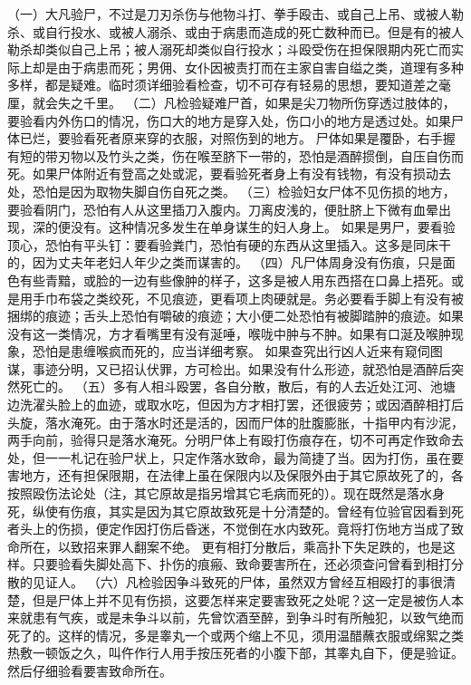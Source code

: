 \documentclass[12pt,UTF8]{ctexbook}
\begin{document}
（一）大凡验尸，不过是刀刃杀伤与他物斗打、拳手殴击、或自己上吊、或被人勒杀、或自行投水、或被人溺杀、或由于病患而造成的死亡数种而已。但是有的被人勒杀却类似自己上吊；被人溺死却类似自行投水；斗殴受伤在担保限期内死亡而实际上却是由于病患而死；男佣、女仆因被责打而在主家自害自缢之类，道理有多种多样，都是疑难。临时须详细验看检查，切不可存有轻易的思想，要知道差之毫厘，就会失之千里。
（二）凡检验疑难尸首，如果是尖刀物所伤穿透过肢体的，要验看内外伤口的情况，伤口大的地方是穿入处，伤口小的地方是透过处。如果尸体已烂，要验看死者原来穿的衣服，对照伤到的地方。
尸体如果是覆卧，右手握有短的带刃物以及竹头之类，伤在喉至脐下一带的，恐怕是酒醉掼倒，自压自伤而死。如果尸体附近有登高之处或泥，要看验死者身上有没有钱物，有没有损动去处，恐怕是因为取物失脚自伤自死之类。
（三）检验妇女尸体不见伤损的地方，要验看阴门，恐怕有人从这里插刀入腹内。刀离皮浅的，便肚脐上下微有血晕出现，深的便没有。这种情况多发生在单身谋生的妇人身上。
如果是男尸，要看验顶心，恐怕有平头钉：要看验粪门，恐怕有硬的东西从这里插入。这多是同床干的，因为丈夫年老妇人年少之类而谋害的。
（四）凡尸体周身没有伤痕，只是面色有些青黯，或脸的一边有些像肿的样子，这多是被人用东西搭在口鼻上捂死。或是用手巾布袋之类绞死，不见痕迹，更看项上肉硬就是。务必要看手脚上有没有被捆绑的痕迹；舌头上恐怕有嚼破的痕迹；大小便二处恐怕有被脚踏肿的痕迹。如果没有这一类情况，方才看嘴里有没有涎唾，喉咙中肿与不肿。如果有口涎及喉肿现象，恐怕是患缠喉疯而死的，应当详细考察。
如果查究出行凶人近来有窥伺图谋，事迹分明，又已招认伏罪，方可检出。如果没有什么形迹，就恐怕是酒醉后突然死亡的。
（五）多有人相斗殴罢，各自分散，散后，有的人去近处江河、池塘边洗濯头脸上的血迹，或取水吃，但因为方才相打罢，还很疲劳；或因酒醉相打后头旋，落水淹死。由于落水时还是活的，因而尸体的肚腹膨胀，十指甲内有沙泥，两手向前，验得只是落水淹死。分明尸体上有殴打伤痕存在，切不可再定作致命去处，但一一札记在验尸状上，只定作落水致命，最为简捷了当。因为打伤，虽在要害地方，还有担保限期，在法律上虽在保限内以及保限外由于其它原故死了的，各按照殴伤法论处（注，其它原故是指另增其它毛病而死的）。现在既然是落水身死，纵使有伤痕，其实是因为其它原故致死是十分清楚的。曾经有位验官因看到死者头上的伤损，便定作因打伤后昏迷，不觉倒在水内致死。竟将打伤地方当成了致命所在，以致招来罪人翻案不绝。
更有相打分散后，乘高扑下失足跌的，也是这样。只要验看失脚处高下、扑伤的痕瘢、致命要害所在，还必须查问曾看到相打分散的见证人。
（六）凡检验因争斗致死的尸体，虽然双方曾经互相殴打的事很清楚，但是尸体上并不见有伤损，这要怎样来定要害致死之处呢？这一定是被伤人本来就患有气疾，或是未争斗以前，先曾饮酒至醉，到争斗时有所触犯，以致气绝而死了的。这样的情况，多是睾丸一个或两个缩上不见，须用温醋蘸衣服或绵絮之类热敷一顿饭之久，叫仵作行人用手按压死者的小腹下部，其睾丸自下，便是验证。然后仔细验看要害致命所在。
\end{document}
